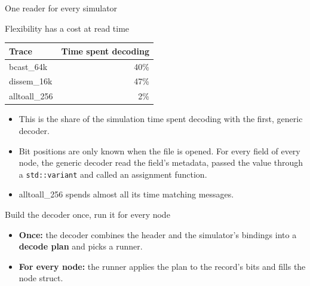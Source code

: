 \documentclass[aspectratio=169,11pt]{beamer}
\begin{document}
\begin{frame}{One reader for every simulator}
\vfill\centering\resizebox{!}{0.75\textheight}{}
\vfill
\end{frame}

\begin{frame}{Flexibility has a cost at read time}
\centering
\begin{tabular}{lr}
\toprule
\textbf{Trace} & \textbf{Time spent decoding} \\
\midrule
bcast\_64k & 40\% \\
dissem\_16k & 47\% \\
alltoall\_256 & 2\% \\
\bottomrule
\end{tabular}
\par\raggedright\vspace{6mm}
\begin{itemize}
\item This is the share of the simulation time spent decoding with the first, generic decoder.
\item Bit positions are only known when the file is opened. For every field of every node, the generic decoder read the field's metadata, passed the value through a \texttt{std::variant} and called an assignment function.
\item alltoall\_256 spends almost all its time matching messages.
\end{itemize}
\end{frame}

\begin{frame}{Build the decoder once, run it for every node}
\vfill\centering\resizebox{\linewidth}{!}{}
\vfill\par\raggedright
\begin{itemize}
\item \textbf{Once:} the decoder combines the header and the simulator's bindings into a \textbf{decode plan} and picks a runner.
\item \textbf{For every node:} the runner applies the plan to the record's bits and fills the node struct.
\end{itemize}
\end{frame}
\end{document}
